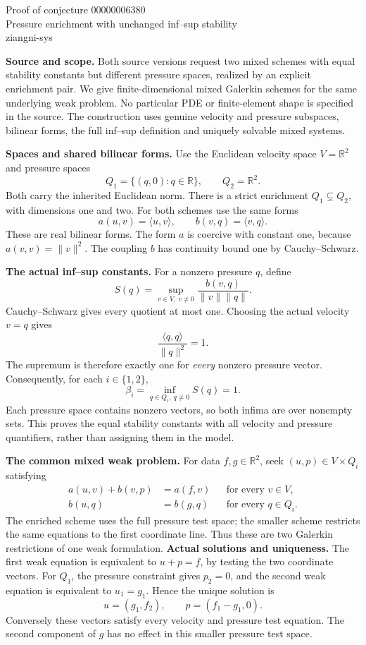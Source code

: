 \documentclass[11pt]{article}
\begin{document}
\begin{center}
{\Large Proof of conjecture 00000006380}\\[5pt]
Pressure enrichment with unchanged inf--sup stability\\
ziangni-sys
\end{center}
\textbf{Source and scope.}
Both source versions request two mixed schemes with equal stability constants but different pressure spaces, realized by an explicit enrichment pair. We give finite-dimensional mixed Galerkin schemes for the same underlying weak problem. No particular PDE or finite-element shape is specified in the source. The construction uses genuine velocity and pressure subspaces, bilinear forms, the full inf--sup definition and uniquely solvable mixed systems.

\textbf{Spaces and shared bilinear forms.}
Use the Euclidean velocity space $V=\mathbb R^2$ and pressure spaces
\[
 Q_1=\{(q,0):q\in\mathbb R\},\qquad Q_2=\mathbb R^2.
\]
Both carry the inherited Euclidean norm. There is a strict enrichment $Q_1\subsetneq Q_2$, with dimensions one and two. For both schemes use the same forms
\[
 a(u,v)=\langle u,v\rangle,\qquad b(v,q)=\langle v,q\rangle.
\]
These are real bilinear forms. The form $a$ is coercive with constant one, because $a(v,v)=\|v\|^2$. The coupling $b$ has continuity bound one by Cauchy--Schwarz.

\textbf{The actual inf--sup constants.}
For a nonzero pressure $q$, define
\[
 S(q)=\sup_{v\in V,\ v\ne0}
       \frac{b(v,q)}{\|v\|\|q\|}.
\]
Cauchy--Schwarz gives every quotient at most one. Choosing the actual velocity $v=q$ gives
\[
 \frac{\langle q,q\rangle}{\|q\|^2}=1.
\]
The supremum is therefore exactly one for \emph{every} nonzero pressure vector. Consequently, for each $i\in\{1,2\}$,
\[
 \beta_i=\inf_{q\in Q_i,\ q\ne0} S(q)=1.
\]
Each pressure space contains nonzero vectors, so both infima are over nonempty sets. This proves the equal stability constants with all velocity and pressure quantifiers, rather than assigning them in the model.

\textbf{The common mixed weak problem.}
For data $f,g\in\mathbb R^2$, seek $(u,p)\in V\times Q_i$ satisfying
\[
 \begin{aligned}
 a(u,v)+b(v,p)&=a(f,v)&&\text{for every }v\in V,\\
 b(u,q)&=b(g,q)&&\text{for every }q\in Q_i.
 \end{aligned}
\]
The enriched scheme uses the full pressure test space; the smaller scheme restricts the same equations to the first coordinate line. Thus these are two Galerkin restrictions of one weak formulation.
\newpage
\textbf{Actual solutions and uniqueness.}
The first weak equation is equivalent to $u+p=f$, by testing the two coordinate vectors. For $Q_1$, the pressure constraint gives $p_2=0$, and the second weak equation is equivalent to $u_1=g_1$. Hence the unique solution is
\[
 u=(g_1,f_2),\qquad p=(f_1-g_1,0).
\]
Conversely these vectors satisfy every velocity and pressure test equation. The second component of $g$ has no effect in this smaller pressure test space.
\end{document}
